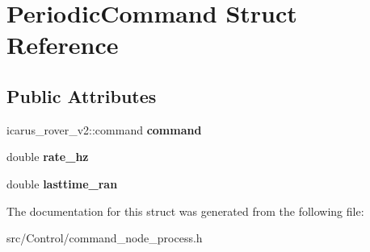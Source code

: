 \hypertarget{structPeriodicCommand}{}\section{Periodic\+Command Struct Reference}
\label{structPeriodicCommand}
\subsection*{Public Attributes}
\begin{DoxyCompactItemize}
\item 
\mbox{\label{structPeriodicCommand_a638bc5c5663aa3bda46c70da8cd29bd6}} 
icarus\+\_\+rover\+\_\+v2\+::command {\bfseries command}
\item 
\mbox{\label{structPeriodicCommand_a71ad7e2fe7b1eb68864c8e52f69c9243}} 
double {\bfseries rate\+\_\+hz}
\item 
\mbox{\label{structPeriodicCommand_a1d90f1cfc3a14c6d769175205ee77682}} 
double {\bfseries lasttime\+\_\+ran}
\end{DoxyCompactItemize}


The documentation for this struct was generated from the following file\+:\begin{DoxyCompactItemize}
\item 
src/\+Control/command\+\_\+node\+\_\+process.\+h\end{DoxyCompactItemize}
